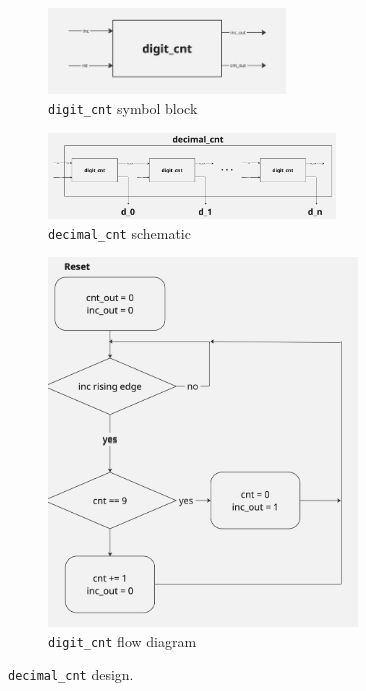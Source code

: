 \documentclass[12pt]{article}   	%
\begin{document}
\begin{figure}[htb]
    \centering
    \begin{subfigure}[t]{0.4\textwidth}
        \centering
        \includegraphics[height=0.9in]{img/digit_cnt_sym}
        \caption{\lstinline|digit_cnt| symbol block}
        \label{fig:digit_cnt_sym}
    \end{subfigure}%
    \begin{subfigure}[t]{0.6\textwidth}
        \centering
        \includegraphics[height=0.9in]{img/decimal_cnt_sch}
        \caption{\lstinline|decimal_cnt| schematic}
        \label{fig:decimal_cnt_sch}
    \end{subfigure}
    \hfill
    \begin{subfigure}[t]{0.6\textwidth}
        \centering
        \includegraphics[width=0.9\textwidth]{img/digit_cnt_diag}
        \caption{\lstinline|digit_cnt| flow diagram}
        \label{fig:digit_cnt_diag}
    \end{subfigure}
    \caption{\lstinline|decimal_cnt| design.}
    \label{fig:decimal_cnt_figs}
\end{figure}
\end{document}
